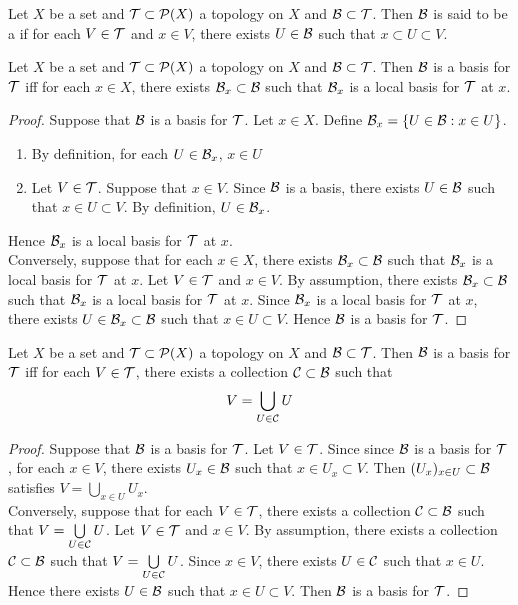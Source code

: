 \documentclass{book}
\begin{document}
	\begin{defn} 
	Let $X$ be a set and $\mathcal{T} \subset \mathcal{P}(X)$ a topology on $X$ and $\mathcal{B} \subset \mathcal{T}$. Then $\mathcal{B}$ is said to be a  if for each $V \in \mathcal{T}$ and $x \in V$, there exists $U \in \mathcal{B}$ such that $x \subset U \subset V$.
	\end{defn}

	\begin{ex} 
	Let $X$ be a set and $\mathcal{T} \subset \mathcal{P}(X)$ a topology on $X$ and $\mathcal{B} \subset \mathcal{T}$. Then $\mathcal{B}$ is a basis for $\mathcal{T}$ iff for each $x \in X$, there exists $\mathcal{B}_x \subset \mathcal{B}$ such that $\mathcal{B}_x$ is a local basis for $\mathcal{T}$ at $x$. 
	\end{ex}

	\begin{proof}
		Suppose that $\mathcal{B}$ is a basis for $\mathcal{T}$. Let $x \in X$. Define $\mathcal{B}_x = \{U \in \mathcal{B}: x \in U\}$. 
		\begin{enumerate}
			\item By definition, for each $U \in \mathcal{B}_x$, $x \in U$
			\item Let $V \in \mathcal{T}$. Suppose that $x \in V$. Since $\mathcal{B}$ is a basis, there exists $U \in \mathcal{B}$ such that $x \in U \subset V$. By definition, $U \in \mathcal{B}_x$.
		\end{enumerate}
		Hence $\mathcal{B}_x$ is a local basis for $\mathcal{T}$ at $x$. \\
		Conversely, suppose that for each $x \in X$, there exists $\mathcal{B}_x \subset \mathcal{B}$ such that $\mathcal{B}_x$ is a local basis for $\mathcal{T}$ at $x$. Let $V \in \mathcal{T}$ and $x \in V$. By assumption, there exists $\mathcal{B}_x \subset \mathcal{B}$ such that $\mathcal{B}_x$ is a local basis for $\mathcal{T}$ at $x$. Since $\mathcal{B}_x$ is a local basis for $\mathcal{T}$ at $x$, there exists $U \in \mathcal{B}_x \subset \mathcal{B}$ such that $x \in U \subset V$. Hence $\mathcal{B}$ is a basis for $\mathcal{T}$. 
	\end{proof}
	
	\begin{ex} 
	Let $X$ be a set and $\mathcal{T} \subset \mathcal{P}(X)$ a topology on $X$ and $\mathcal{B} \subset \mathcal{T}$. Then $\mathcal{B}$ is a basis for $\mathcal{T}$ iff for each $V \in \mathcal{T}$, there exists a collection $\mathcal{C} \subset \mathcal{B}$ such that $$V = \bigcup\limits_{U \in \mathcal{C}} U$$
	\end{ex}
	
	\begin{proof}
	Suppose that $\mathcal{B}$ is a basis for $\mathcal{T}$. Let $V \in \mathcal{T}$. Since since $\mathcal{B}$ is a basis for $\mathcal{T}$, for each $x \in V$, there exists $U_x \in \mathcal{B}$ such that $x \in U_x \subset V$. Then $(U_x)_{x \in U} \subset \mathcal{B}$ satisfies $V = \bigcup\limits_{x \in U} U_x$. \\
	Conversely, suppose that for each $V \in \mathcal{T}$, there exists a collection $\mathcal{C} \subset \mathcal{B}$ such that $V = \bigcup\limits_{U \in \mathcal{C}} U$. Let $V \in \mathcal{T}$ and $x \in V$. By assumption, there exists a collection $\mathcal{C} \subset \mathcal{B}$ such that $V = \bigcup\limits_{U \in \mathcal{C}} U$. Since $x \in V$, there exists $U \in \mathcal{C}$ such that $x \in U$. Hence there exists $U \in \mathcal{B}$ such that $x \in U \subset V$. Then $\mathcal{B}$ is a basis for $\mathcal{T}$.
	\end{proof}
	
\end{document}
